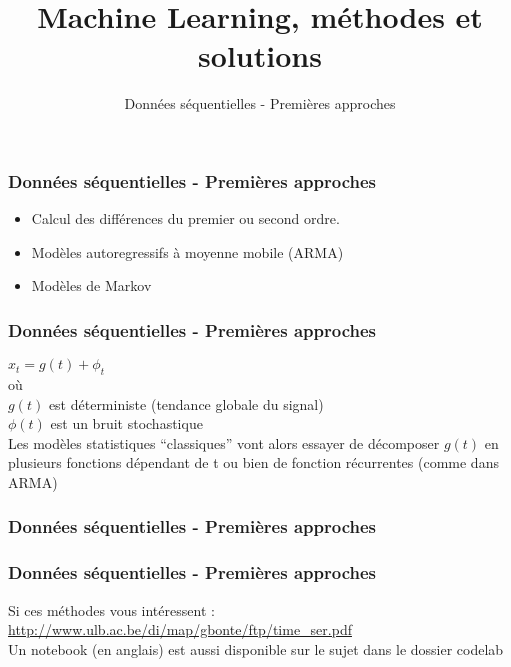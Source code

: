 \documentclass{formation}
\title{Machine Learning, méthodes et solutions}
\subtitle{Données séquentielles - Premières approches }
\begin{document}
\maketitle

\begin{frame}
  \frametitle{Données séquentielles - Premières approches }
  \begin{itemize}
  \item Calcul des différences du premier ou second ordre.
  \item Modèles autoregressifs à moyenne mobile (ARMA)
  \item Modèles de Markov 
  \end{itemize}
\end{frame}

\begin{frame}
  \frametitle{Données séquentielles - Premières approches }
  
  $x_t=g(t)+\phi_t$ \\
  où \\
  $g(t)$ est déterministe (tendance globale du signal) \\
  $\phi(t)$ est un bruit stochastique \\
  \newline
  Les modèles statistiques ``classiques'' vont alors essayer de décomposer $g(t)$ en plusieurs fonctions dépendant de t ou bien de fonction récurrentes (comme dans ARMA)
\end{frame}

\begin{frame}
  \frametitle{Données séquentielles - Premières approches }
\end{frame}

\begin{frame}
  \frametitle{Données séquentielles - Premières approches }
  Si ces méthodes vous intéressent : \\
  \newline
  \url{http://www.ulb.ac.be/di/map/gbonte/ftp/time_ser.pdf} \\
  \newline
  Un notebook (en anglais) est aussi disponible sur le sujet dans le dossier codelab
\end{frame}
\end{document}
